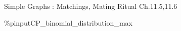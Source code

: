 \documentclass[handout]{mcs}
\begin{document}

\begin{staffnotes}
Simple Graphs : Matchings, Mating Ritual Ch.11.5,11.6
\end{staffnotes}








\%pinput{CP_binomial_distribution_max}




\end{document}
